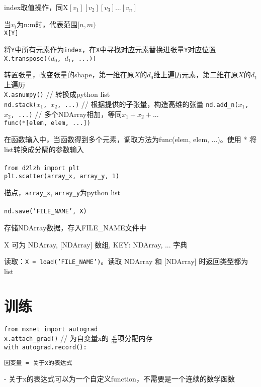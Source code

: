 \documentclass[UTF8]{ctexart}
\begin{document}
  index取值操作，同X$[v_1][v_2][v_3]...[v_n]$

  当$v_i$为n:m时，代表范围$[n, m)$\\
\texttt{X[Y]}

  将\texttt{Y}中所有元素作为\texttt{index}，在\texttt{X}中寻找对应元素替换进张量\texttt{Y}对应位置\\
\texttt{X.transpose(($d_0$, $d_1$, ...))}

  转置张量，改变张量的shape，第一维在原$X$的$d_0$维上遍历元素，第二维在原$X$的$d_1$上遍历\\
\texttt{X.asnumpy()} // 转换成python list\\
\texttt{nd.stack($x_1$, $x_2$, ...)} // 根据提供的子张量，构造高维的张量
\texttt{nd.add\_n($x_1$, $x_2$, ...)} // 多个NDArray相加，等同$x_1 + x_2 + ...$\\
\texttt{func(*[elem, elem, ...])}

  在函数输入中，当函数得到多个元素，调取方法为func(elem, elem, ...)。使用 * 将list转换成分隔的参数输入\\\\
\texttt{from d2lzh import plt}\\
\texttt{plt.scatter(array\_x, array\_y, 1)}

  描点，\texttt{array\_x}, \texttt{array\_y}为python list\\\\
\texttt{nd.save('FILE\_NAME', X)}

  存储NDArray数据，存入FILE\_NAME文件中

  X 可为 NDArray, [NDArray] 数组, {KEY: NDArray, ...} 字典
  
  读取：\texttt{X = load('FILE\_NAME')}。读取 NDArray 和 [NDArray] 时返回类型都为list

\section{训练}

\noindent \texttt{from mxnet import autograd}\\
\texttt{x.attach\_grad()} // 为自变量x的 $\frac{d }{d x} $项分配内存\\
\texttt{with autograd.record():}

  \texttt{因变量 = 关于x的表达式}
  
  - 关于x的表达式可以为一个自定义function，不需要是一个连续的数学函数
  
\end{document}
